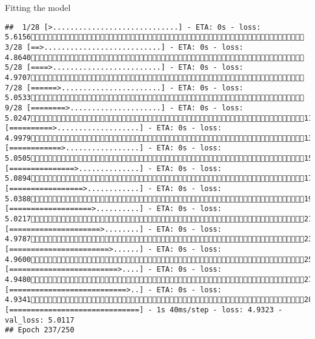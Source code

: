 \documentclass[
  ignorenonframetext,
]{beamer}
\begin{document}
\begin{frame}[fragile]{Fitting the model}
\begin{verbatim}
##  1/28 [>.............................] - ETA: 0s - loss: 5.6156 3/28 [==>...........................] - ETA: 0s - loss: 4.8640 5/28 [====>.........................] - ETA: 0s - loss: 4.9707 7/28 [======>.......................] - ETA: 0s - loss: 5.0533 9/28 [========>.....................] - ETA: 0s - loss: 5.024711/28 [==========>...................] - ETA: 0s - loss: 4.997913/28 [============>.................] - ETA: 0s - loss: 5.050515/28 [===============>..............] - ETA: 0s - loss: 5.089417/28 [=================>............] - ETA: 0s - loss: 5.038819/28 [===================>..........] - ETA: 0s - loss: 5.021721/28 [=====================>........] - ETA: 0s - loss: 4.978723/28 [=======================>......] - ETA: 0s - loss: 4.960025/28 [=========================>....] - ETA: 0s - loss: 4.948027/28 [===========================>..] - ETA: 0s - loss: 4.934128/28 [==============================] - 1s 40ms/step - loss: 4.9323 - val_loss: 5.0117
## Epoch 237/250

\end{verbatim}
\end{frame}
\end{document}

